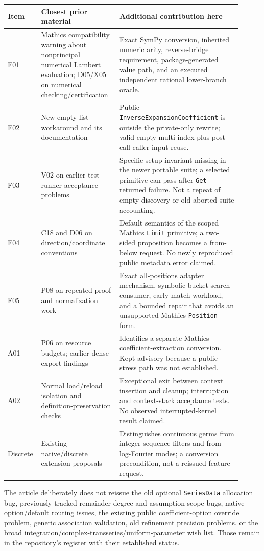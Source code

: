 \documentclass[11pt,letterpaper]{article}
\newcommand{\code}[1]{\texttt{#1}}
\begin{document}
\begin{longtable}{@{}P{0.09\linewidth}P{0.32\linewidth}P{0.50\linewidth}@{}}
\toprule
Item & Closest prior material & Additional contribution here\\
\midrule\endhead
F01 & Mathics compatibility warning about nonprincipal numerical Lambert evaluation; D05/X05 on numerical checking/certification & Exact SymPy conversion, inherited numeric arity, reverse-bridge requirement, package-generated value path, and an executed independent rational lower-branch oracle.\\[5pt]
F02 & New empty-list workaround and its documentation & Public \code{InverseExpansionCoefficient} is outside the private-only rewrite; valid empty multi-index plus post-call caller-input reuse.\\[5pt]
F03 & V02 on earlier test-runner acceptance problems & Specific setup invariant missing in the newer portable suite; a selected primitive can pass after \code{Get} returned failure. Not a repeat of empty discovery or old aborted-suite accounting.\\[5pt]
F04 & C18 and D06 on direction/coordinate conventions & Default semantics of the scoped Mathics \code{Limit} primitive; a two-sided proposition becomes a from-below request. No newly reproduced public metadata error claimed.\\[5pt]
F05 & P08 on repeated proof and normalization work & Exact all-positions adapter mechanism, symbolic bucket-search consumer, early-match workload, and a bounded repair that avoids an unsupported Mathics \code{Position} form.\\[5pt]
A01 & P06 on resource budgets; earlier dense-export findings & Identifies a separate Mathics coefficient-extraction conversion. Kept advisory because a public stress path was not established.\\[5pt]
A02 & Normal load/reload isolation and definition-preservation checks & Exceptional exit between context insertion and cleanup; interruption and context-stack acceptance tests. No observed interrupted-kernel result claimed.\\[5pt]
Discrete & Existing native/discrete extension proposals & Distinguishes continuous germs from integer-sequence filters and from log-Fourier modes; a conversion precondition, not a reissued feature request.\\
\bottomrule
\end{longtable}

The article deliberately does not reissue the old optional \code{SeriesData} allocation bug, previously tracked remainder-degree and assumption-scope bugs, native option/default routing issues, the existing public coefficient-option override problem, generic association validation, old refinement precision problems, or the broad integration/complex-transseries/uniform-parameter wish list. Those remain in the repository's register with their established status.~\cite{register,intake}
\end{document}
